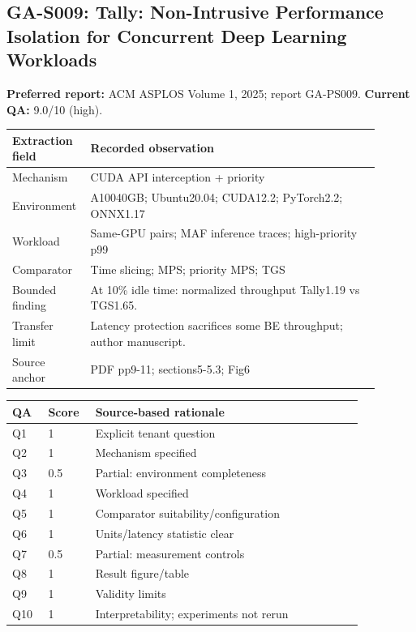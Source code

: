 \subsection{GA-S009: Tally: Non-Intrusive Performance Isolation for Concurrent Deep Learning Workloads}
\textbf{Preferred report:} ACM ASPLOS Volume 1, 2025; report GA-PS009. \textbf{Current QA:} 9.0/10 (high).
\begin{longtable}{P{0.15\linewidth}P{0.75\linewidth}}
\toprule Extraction field & Recorded observation\\\midrule\endhead
Mechanism & CUDA API interception + priority\\
Environment & A10040GB; Ubuntu20.04; CUDA12.2; PyTorch2.2; ONNX1.17\\
Workload & Same-GPU pairs; MAF inference traces; high-priority p99\\
Comparator & Time slicing; MPS; priority MPS; TGS\\
Bounded finding & At 10\% idle time: normalized throughput Tally1.19 vs TGS1.65.\\
Transfer limit & Latency protection sacrifices some BE throughput; author manuscript.\\
Source anchor & PDF pp9-11; sections5-5.3; Fig6\\
\bottomrule\end{longtable}
\begin{longtable}{P{0.09\linewidth}P{0.10\linewidth}P{0.67\linewidth}}
\toprule QA & Score & Source-based rationale\\\midrule\endhead
Q1 & 1 & Explicit tenant question\\
Q2 & 1 & Mechanism specified\\
Q3 & 0.5 & Partial: environment completeness\\
Q4 & 1 & Workload specified\\
Q5 & 1 & Comparator suitability/configuration\\
Q6 & 1 & Units/latency statistic clear\\
Q7 & 0.5 & Partial: measurement controls\\
Q8 & 1 & Result figure/table\\
Q9 & 1 & Validity limits\\
Q10 & 1 & Interpretability; experiments not rerun\\
\bottomrule\end{longtable}

